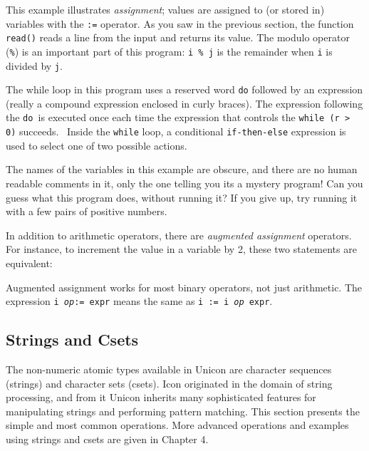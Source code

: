 This example illustrates \textit{assignment}; values
are assigned to (or {\textquotedbl}stored in{\textquotedbl}) variables
with the \texttt{:=} operator. As you saw in the previous section, the
function \texttt{read()} reads a line from the input and returns its
value. The modulo operator (\texttt{\%}) is an important part of this
program: \texttt{i \% j} is the remainder when
\texttt{i} is divided by \texttt{j}.

The while loop in this program uses a reserved word
\texttt{do} followed by an expression (really a compound expression
enclosed in curly braces). The expression following the \texttt{do }is
executed once each time the expression that controls the \texttt{while
(r {\textgreater} 0)} succeeds. \ Inside the \texttt{while} loop, a
conditional
\texttt{if-then-else} expression is used to select
one of two possible actions.

The names of the variables in this example are obscure, and there are no
human readable comments in it, only the one telling you
it{\textquotesingle}s a {\textquotedbl}mystery
program{\textquotesingle}!{\textquotedbl} Can you guess what this
program does, without running it? If you give up, try running it with a
few pairs of positive numbers.

In addition to arithmetic operators, there are \textit{augmented assignment} operators. For instance, to
increment the value in a variable by 2, these two statements are
equivalent:


Augmented assignment works for most binary
operators, not just arithmetic. The expression \texttt{i
}\texttt{\textit{op}}\texttt{:= expr} means the same as \texttt{i := i
}\texttt{\textit{op}}\texttt{ expr}.

\subsection{Strings and Csets}

The non-numeric atomic types available in Unicon are character sequences
(strings) and character sets
(csets). Icon originated in the domain of string
processing, and from it Unicon inherits many sophisticated features for
manipulating strings and performing pattern
matching. This section presents the simple and most common operations.
More advanced operations and examples using strings and csets are given
in Chapter 4.


